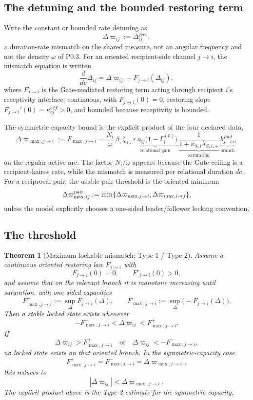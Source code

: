 \documentclass[11pt,a4paper]{article}
\def\mathfrak#1{#1}%
\def\mathrm#1{#1}%
\theoremstyle{definition}
\theoremstyle{plain}
\newtheorem{theorem}[definition]{Theorem}
\theoremstyle{remark}
\begin{document}
\subsection{The detuning and the bounded restoring term}

Write the constant or bounded rate detuning as
\[
\Delta\varpi_{ij}:=\Delta^{\mathrm{free}}_{ij},
\]
a duration-rate mismatch on the shared measure, not an angular frequency and not
the density \(\omega\) of P0.3. For an oriented recipient-side channel
\(j\to i\), the mismatch equation is written
\[
\frac{d}{d\mathfrak c}\Delta_{ij}
=
\Delta\varpi_{ij}-F_{j\to i}(\Delta_{ij}),
\]
where \(F_{j\to i}\) is the Gate-mediated restoring term acting through recipient
\(i\)'s receptivity interface: continuous, with \(F_{j\to i}(0)=0\), restoring slope
\(F_{j\to i}'(0)=\kappa^{\mathrm{eff}}_{ij}>0\), and bounded because receptivity is
bounded.

The symmetric capacity bound is the explicit product of the four declared data,
\[
\boxed{\;
\Delta\varpi_{\max,j\to i}
:=
F_{\max,j\to i}
=
\frac{N_i}{\omega}\,
\beta_i\,\zeta_{0,i}\,
\underbrace{\varepsilon\,a_{ij}\bigl(1-\Gamma_i^{(0)}\bigr)}_{\text{relational gain}}\,
\underbrace{\frac{1}{1+\kappa_{\lambda,i}\lambda_{S,i,+}}}_{\text{saturation}}\,
\underbrace{b^{\mathrm{fold}}_{j\to i}}_{\text{branch}},
\;}
\]
on the regular active arc. The factor \(N_i/\omega\) appears because the Gate
ceiling is a recipient-kairos rate, while the mismatch is measured per relational
duration \(d\mathfrak c\). For a reciprocal pair, the usable pair threshold is the
oriented minimum
\[
\Delta\varpi_{\max,ij}^{\rm pair}
:=
\min\{\Delta\varpi_{\max,j\to i},\Delta\varpi_{\max,i\to j}\},
\]
unless the model explicitly chooses a one-sided leader/follower locking
convention.

\subsection{The threshold}

\begin{theorem}[Maximum lockable mismatch; Type-1 / Type-2]\label{thm:maxlock}
Assume a continuous oriented restoring law \(F_{j\to i}\) with
\[
F_{j\to i}(0)=0,
\qquad
F'_{j\to i}(0)>0,
\]
and assume that on the relevant branch it is monotone increasing until saturation,
with one-sided capacities
\[
F^+_{\max,j\to i}:=\sup_{\Delta}F_{j\to i}(\Delta),
\qquad
F^-_{\max,j\to i}:=\sup_{\Delta}\bigl(-F_{j\to i}(\Delta)\bigr).
\]
Then a stable locked state exists whenever
\[
-F^-_{\max,j\to i}
<
\Delta\varpi_{ij}
<
F^+_{\max,j\to i}.
\]
If
\[
\Delta\varpi_{ij}>F^+_{\max,j\to i}
\quad\text{or}\quad
\Delta\varpi_{ij}< -F^-_{\max,j\to i},
\]
no locked state exists on that oriented branch. In the symmetric-capacity case
\[
F^+_{\max,j\to i}=F^-_{\max,j\to i}
=\Delta\varpi_{\max,j\to i},
\]
this reduces to
\[
|\Delta\varpi_{ij}|<\Delta\varpi_{\max,j\to i}.
\]
The explicit product above is the Type-2 estimate for the symmetric capacity.
\end{theorem}
\end{document}
